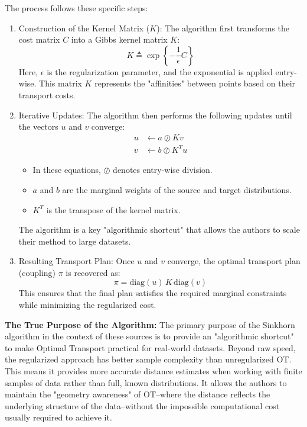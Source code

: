\documentclass[11pt, a4paper]{article}
\theoremstyle{plain} %
\theoremstyle{definition} %
\begin{document}
				The process follows these specific steps:
					\begin{enumerate}
						\item Construction of the Kernel Matrix ($K$): The algorithm first transforms the cost matrix $C$ into a Gibbs kernel matrix $K$:
						\begin{equation}
							\label{eq:kernel_matrix}
							K \triangleq \exp\left\{-\frac{1}{\epsilon} C\right\}
						\end{equation}
						Here, $\epsilon$ is the regularization parameter, and the exponential is applied entry-wise. This matrix $K$ represents the "affinities" between points based on their transport costs.
						\item Iterative Updates: The algorithm then performs the following updates until the vectors $u$ and $v$ converge:
						\begin{align}
							u &\leftarrow a \oslash Kv \label{eq:sinkhorn_u} \\
							v &\leftarrow b \oslash K^T u \label{eq:sinkhorn_v}
						\end{align}
						\begin{itemize}
							\item In these equations, $\oslash$ denotes entry-wise division.
							\item $a$ and $b$ are the marginal weights of the source and target distributions.
							\item $K^T$ is the transpose of the kernel matrix.
						\end{itemize}
						The algorithm is a key "algorithmic shortcut" that allows the authors to scale their method to large datasets.
						\item Resulting Transport Plan: Once $u$ and $v$ converge, the optimal transport plan (coupling) $\pi$ is recovered as:
						\begin{equation}
							\label{eq:transport_plan}
							\pi = \text{diag}(u) \, K \, \text{diag}(v)
						\end{equation}
						This ensures that the final plan satisfies the required marginal constraints while minimizing the regularized cost.
					\end{enumerate}

					\textbf{The True Purpose of the Algorithm:} The primary purpose of the Sinkhorn algorithm in the context of these sources is to provide an "algorithmic shortcut" to make Optimal Transport practical for real-world datasets. Beyond raw speed, the regularized approach has better sample complexity than unregularized OT. This means it provides more accurate distance estimates when working with finite samples of data rather than full, known distributions. It allows the authors to maintain the "geometry awareness" of OT--where the distance reflects the underlying structure of the data--without the impossible computational cost usually required to achieve it.
\end{document}
